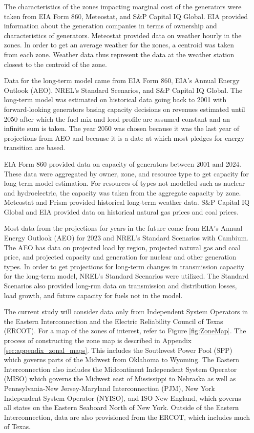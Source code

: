 \documentclass[12pt]{article}
\begin{document}
The characteristics of the zones impacting marginal cost of the generators were taken from EIA Form 860, Meteostat, and S\&P Capital IQ Global. EIA provided information about the generation companies in terms of ownership and characteristics of generators. Meteostat provided data on weather hourly in the zones. In order to get an average weather for the zones, a centroid was taken from each zone. Weather data thus represent the data at the weather station closest to the centroid of the zone.

Data for the long-term model came from EIA Form 860, EIA's Annual Energy Outlook (AEO), NREL's Standard Scenarios, and S\&P Capital IQ Global. The long-term model was estimated on historical data going back to 2001 with forward-looking generators basing capacity decisions on revenues estimated until 2050 after which the fuel mix and load profile are assumed constant and an infinite sum is taken. The year 2050 was chosen because it was the last year of projections from AEO and because it is a date at which most pledges for energy transition are based.

EIA Form 860 provided data on capacity of generators between 2001 and 2024. These data were aggregated by owner, zone, and resource type to get capacity for long-term model estimation. For resources of types not modelled such as nuclear and hydroelectric, the capacity was taken from the aggregate capacity by zone. Meteostat and Prism provided historical long-term weather data. S\&P Capital IQ Global and EIA provided data on historical natural gas prices and coal prices.

Most data from the projections for years in the future come from EIA's Annual Energy Outlook (AEO) for 2023 and NREL's Standard Scenarios with Cambium. The AEO has data on projected load by region, projected natural gas and coal price, and projected capacity and generation for nuclear and other generation types. In order to get projections for long-term changes in transmission capacity for the long-term model, NREL's Standard Scenarios were utilized. The Standard Scenarios also provided long-run data on transmission and distribution losses, load growth, and future capacity for fuels not in the model.

The current study will consider data only from Independent System Operators in the Eastern Interconnection and the Electric Reliability Council of Texas (ERCOT). For a map of the zones of interest, refer to Figure \ref{fig:ZoneMap}. The process of constructing the zone map is described in Appendix \ref{sec:appendix_zonal_maps}. This includes the Southwest Power Pool (SPP) which governs parts of the Midwest from Oklahoma to Wyoming. The Eastern Interconnection also includes the Midcontinent Independent System Operator (MISO) which governs the Midwest east of Mississippi to Nebraska as well as Pennsylvania-New Jersey-Maryland Interconnection (PJM), New York Independent System Operator (NYISO), and ISO New England, which governs all states on the Eastern Seaboard North of New York. Outside of the Eastern Interconnection, data are also provisioned from the ERCOT, which includes much of Texas.
\end{document}
